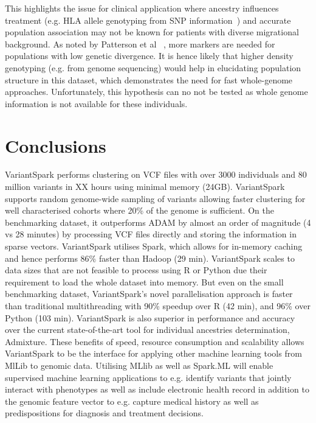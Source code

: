 \documentclass{bmcart}
\newcommand{\variantSpark}{{\sc VariantSpark}}
\begin{document}
This highlights the issue for clinical application where ancestry influences treatment (e.g. HLA allele genotyping from SNP information~\cite{Zheng2014}) and accurate population association may not be known for patients with diverse migrational background.
As noted by Patterson et al ~\cite{Patterson2006}, more markers are needed for populations with low genetic divergence. 
It is hence likely that higher density genotyping (e.g. from genome sequencing) would help in elucidating population structure in this dataset, which demonstrates the need for fast whole-genome approaches. 
Unfortunately, this hypothesis can no not be tested as whole genome information is not available for these individuals. 




\section*{Conclusions}

\variantSpark{} performs clustering on VCF files with over 3000 individuals and 80 million variants in XX hours using minimal memory (24GB). 
\variantSpark{} supports random genome-wide sampling of variants allowing faster clustering for well characterised cohorts where 20\% of the genome is sufficient. 
On the benchmarking dataset, it outperforms {\sc ADAM} by almost an order of magnitude (4 vs 28 minutes) by processing VCF files directly and storing the information in sparse vectors. %
\variantSpark{} utilises {\sc Spark}, which allows for in-memory caching and hence performs 86\% faster than Hadoop (29 min). %
\variantSpark{} scales to data sizes that are not feasible to process using R or Python due their requirement to load the whole dataset into memory. 
But even on the small benchmarking dataset, \variantSpark{}'s novel parallelisation approach is faster than traditional multithreading with 90\% speedup over R (42 min), and 96\% over Python (103 min). %
\variantSpark{} is also superior in performance and accuracy over the current state-of-the-art tool for individual ancestries determination, {\sc Admixture}.
These benefits of speed, resource consumption and scalability allows \variantSpark{} to be the interface for applying other machine learning tools from MlLib to genomic data. 
Utilising MLlib as well as Spark.ML will enable supervised machine learning applications to e.g. identify variants that jointly interact with phenotypes as well as include electronic health record in addition to the genomic feature vector to e.g. capture medical history as well as predispositions for diagnosis and treatment decisions. 
\end{document}
